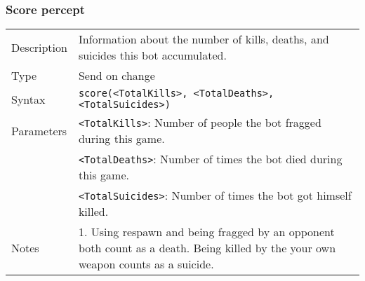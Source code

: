 \documentclass[11pt,a4paper]{article}
\begin{document}
\subsubsection*{Score percept}
\begin{small}
\begin{tabular}{p{2cm}p{9cm}}
Description & Information about the number of kills, deaths, and suicides this bot accumulated.\\
Type & Send on change\\
Syntax & \verb|score(<TotalKills>, <TotalDeaths>, <TotalSuicides>)|\\
Parameters & 
\verb|<TotalKills>|: Number of people the bot fragged during this game.\\
& \verb|<TotalDeaths>|: Number of times the bot died during this game.\\
& \verb|<TotalSuicides>|: Number of times the bot got himself killed.\\
Notes &
	1.	Using respawn and being fragged by an opponent both count as a death. Being killed by the your own weapon counts as a suicide.
\end{tabular}
\end{small}
\end{document}
